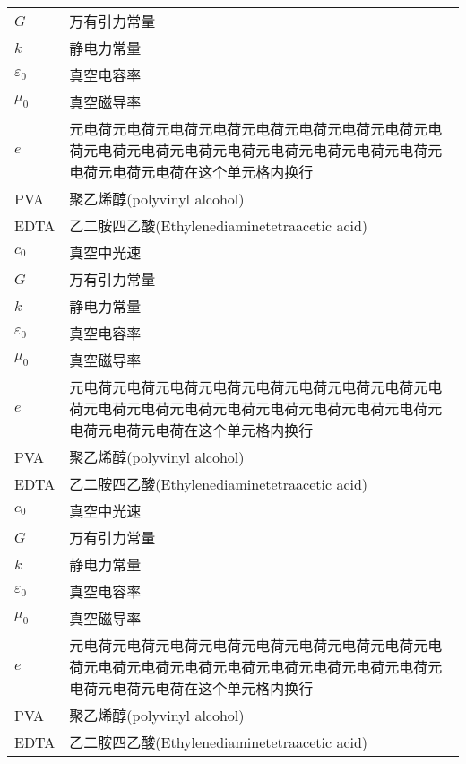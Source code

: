 \begin{denotation}
\begin{longtable}[c]{p{2.5cm}p{12cm}}
    $G$                 & 万有引力常量      \\
    $k$                 & 静电力常量        \\
    $\varepsilon _0$    & 真空电容率        \\
    $\mu_0$             & 真空磁导率        \\
    $e$                 & 元电荷元电荷元电荷元电荷元电荷元电荷元电荷元电荷元电荷元电荷元电荷元电荷元电荷元电荷元电荷元电荷元电荷元电荷元电荷元电荷在这个单元格内换行            \\
    PVA                 & 聚乙烯醇(polyvinyl alcohol)\\
    EDTA                & 乙二胺四乙酸(Ethylenediaminetetraacetic acid)\\
    $c_0$               & 真空中光速        \\
    $G$                 & 万有引力常量      \\
    $k$                 & 静电力常量        \\
    $\varepsilon _0$    & 真空电容率        \\
    $\mu_0$             & 真空磁导率        \\
    $e$                 & 元电荷元电荷元电荷元电荷元电荷元电荷元电荷元电荷元电荷元电荷元电荷元电荷元电荷元电荷元电荷元电荷元电荷元电荷元电荷元电荷在这个单元格内换行            \\
    PVA                 & 聚乙烯醇(polyvinyl alcohol)\\
    EDTA                & 乙二胺四乙酸(Ethylenediaminetetraacetic acid)\\
    $c_0$               & 真空中光速        \\
    $G$                 & 万有引力常量      \\
    $k$                 & 静电力常量        \\
    $\varepsilon _0$    & 真空电容率        \\
    $\mu_0$             & 真空磁导率        \\
    $e$                 & 元电荷元电荷元电荷元电荷元电荷元电荷元电荷元电荷元电荷元电荷元电荷元电荷元电荷元电荷元电荷元电荷元电荷元电荷元电荷元电荷在这个单元格内换行            \\
    PVA                 & 聚乙烯醇(polyvinyl alcohol)\\
    EDTA                & 乙二胺四乙酸(Ethylenediaminetetraacetic acid)\\* \bottomrule
    \end{longtable}

    
\end{denotation}
